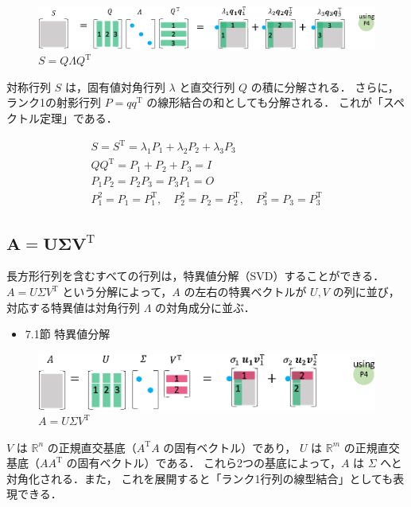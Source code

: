 \documentclass[letterpaper]{article}
\DeclareRobustCommand\transp{^{\mathrm{T}}}
\begin{document}
\begin{figure}[H]
  \includegraphics[keepaspectratio, width=\linewidth]{EVD-j.eps}
  \caption{$S=Q \Lambda Q\transp$}
\end{figure}

対称行列 $S$ は，固有値対角行列 $\lambda$ と直交行列 $Q$ の積に分解される．
さらに，ランク1の射影行列 $P=qq\transp$ の線形結合の和としても分解される．
これが「スペクトル定理」である．

\begin{gather*}
  S=S\transp = \lambda_1 P_1 + \lambda_2 P_2 + \lambda_3 P_3\\
  QQ\transp = P_1 + P_2 + P_3 = I \\
  P_1 P_2 = P_2 P_3 = P_3 P_1 = O\\
  P_1^2 =P_1=P_1\transp, \quad P_2^2=P_2=P_2\transp, \quad P_3^2=P_3=P_3\transp
\end{gather*}

\clearpage

\subsection{$\boldsymbol{A=U \Sigma V\transp}$}

長方形行列を含むすべての行列は，特異値分解（SVD）することができる．
$A=U \Sigma V\transp$ という分解によって，$A$ の左右の特異ベクトルが $U, V$ の列に並び，
対応する特異値は対角行列 $\Lambda$ の対角成分に並ぶ．

\begin{itemize}
  \item 7.1節 特異値分解
\end{itemize}

\begin{figure}[H]
  \includegraphics[keepaspectratio, width=\linewidth]{SVD-j.eps}
  \caption{$A=U \Sigma V\transp$}
\end{figure}

$V$ は $\mathbb{R}^n$ の正規直交基底（$A\transp A$ の固有ベクトル）であり，
$U$ は $\mathbb{R}^m$ の正規直交基底（$AA\transp$ の固有ベクトル）である．
これら2つの基底によって，$A$ は $\Sigma$ へと対角化される．また，
これを展開すると「ランク1行列の線型結合」としても表現できる．
\end{document}
